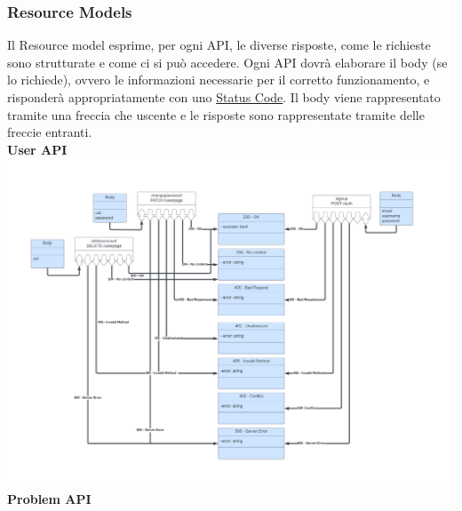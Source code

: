 \documentclass[11pt, a4paper]{article}
\theoremstyle{definition}
\begin{document}
\subsubsection{Resource Models}
Il Resource model esprime, per ogni API, le diverse risposte, come le richieste sono strutturate e come ci si può accedere.
Ogni API dovrà elaborare il body (se lo richiede), ovvero le informazioni necessarie per il corretto funzionamento, e risponderà appropriatamente con uno \href{https://developer.mozilla.org/en-US/docs/Web/HTTP/Status}{Status Code}.
Il body viene rappresentato tramite una freccia che uscente e le risposte sono rappresentate tramite delle freccie entranti.\\

\textbullet \textbf{ User API}\\
\includegraphics[width=\textwidth]{materiale/Resource Models Users.png}
\newpage
\textbullet \textbf{ Problem API}\\
\end{document}
